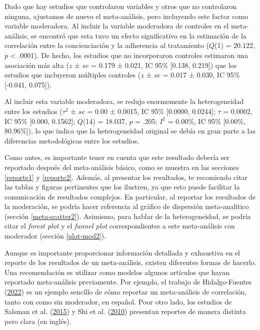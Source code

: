 \documentclass[
  bookmarksnumbered]{article}
\begin{document}
\begin{tcolorbox}[enhanced,attach boxed title to top center={yshift=-3mm,yshifttext=-1mm},
  colback=iacol!5!white,colframe=iacol!75!white,colbacktitle=iacol,
  title=Ejemplo de reporte con moderador categórico,fonttitle=\bfseries, parbox=false,
  boxed title style={size=small,colframe=iacol} ]
  
Dado que hay estudios que controlaron variables y otros que no controlaron ninguna, ajustamos de nuevo el meta-análisis, pero incluyendo este factor como variable moderadora. Al incluir la variable moderadora de controles en el meta-análisis, se encontró que esta tuvo un efecto significativo en la estimación de la correlación entre la concienciación y la adherencia al tratamiento ($Q$(1) = 20.122, $p$ < .0001). De hecho, los estudios que no incorporaron controles estimaron una asociación más alta ($z$ ± $se$ = 0.179 ± 0.021, IC 95\% [0.138, 0.219]) que los estudios que incluyeron múltiples controles ($z$ ± $se$ = 0.017 ± 0.030, IC 95\% [-0.041, 0.075]).

Al incluir esta variable moderadora, se redujo enormemente la heterogeneidad entre los estudios ($\tau^2$ ± $se$ =  0.00 ± 0.0015, IC 95\% [0.0000, 0.0244]; $\tau$ = 0.0002, IC 95\% [0.000, 0.1562]; $Q$(14) = 18.037, $p$ = .205; $I^2$ = 0.00\%, IC 95\% [0.00\%, 80.96\%]), lo que indica que la heterogeneidad original se debía en gran parte a las diferencias metodológicas entre los estudios.  

\end{tcolorbox}

Como antes, es importante tener en cuenta que este resultado debería ser reportado después del meta-análisis básico, como se muestra en las secciones \ref{reporte1} y \ref{reporte2}. Además, al presentar los resultados, te recomiendo citar las tablas y figuras pertinentes que los ilustren, ya que esto puede facilitar la comunicación de resultados complejos. En particular, al reportar los resultados de la moderación, se podría hacer referencia al gráfico de dispersión meta-analítico (sección \ref{meta-scatter2}). Asimismo, para hablar de la heterogeneidad, se podría citar el \emph{forest plot} y el \emph{funnel plot} correspondientes a este meta-análisis con moderador (sección \ref{plot-mod2}).

Aunque es importante proporcionar información detallada y exhaustiva en el reporte de los resultados de un meta-análisis, existen diferentes formas de hacerlo. Una recomendación es utilizar como modelos algunos artículos que hayan reportado meta-análisis previamente. Por ejemplo, el trabajo de Hidalgo-Fuentes (\protect\hyperlink{ref-hidalgo-fuentesUsoProblematicoInternet2022}{2022}) es un ejemplo sencillo de cómo reportar un meta-análisis de correlación, tanto con como sin moderador, en español. Poor otro lado, los estudios de Salsman et al. (\protect\hyperlink{ref-salsmanMetaanalyticApproachExamining2015}{2015}) y Shi et al. (\protect\hyperlink{ref-shiCorrelationAdherenceRates2010}{2010}) presentan reportes de manera distinta pero clara (en inglés).
\end{document}
